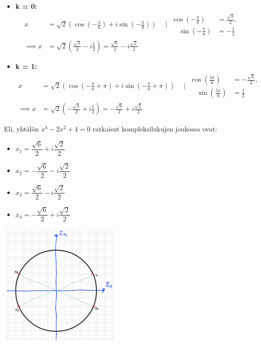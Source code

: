 \documentclass{article}
\begin{document}
\begin{itemize}
    \begin{itemize}
        \item \textbf{k = 0:}
        \[
        \begin{aligned}            
            x &= \sqrt{2} \left( \cos\left( -\frac{\pi}{6} \right) + i \sin\left( -\frac{\pi}{6} \right) \right) \quad \mid
            \begin{aligned}
                \cos\left( -\frac{\pi}{6} \right) &= \frac{\sqrt{3}}{2},\\ \quad \sin\left( -\frac{\pi}{6} \right) &= -\frac{1}{2}
            \end{aligned}\\
            \implies 
                x &= \sqrt{2} \left( \frac{\sqrt{3}}{2} - i \frac{1}{2} \right) = \frac{\sqrt{6}}{2} - i \frac{\sqrt{2}}{2}
        \end{aligned}
        \]
        \item \textbf{k = 1:}
        \[
        \begin{aligned}
            x &= \sqrt{2} \left( \cos\left( -\frac{\pi}{6} + \pi \right) + i \sin\left( -\frac{\pi}{6} + \pi \right) \right) \quad \mid
            \begin{aligned}
                \cos\left( \frac{5\pi}{6} \right) &= -\frac{\sqrt{3}}{2},\\ \quad \sin\left( \frac{5\pi}{6} \right) &= \frac{1}{2}
            \end{aligned} \\
            \implies
            x &= \sqrt{2} \left( -\frac{\sqrt{3}}{2} + i \frac{1}{2} \right) = -\frac{\sqrt{6}}{2} + i \frac{\sqrt{2}}{2}
        \end{aligned}
        \]
    \end{itemize}

    Eli, yhtälön $x^4 - 2x^2 + 4 = 0$ ratkaisut kompleksilukujen joukossa ovat:
    \begin{itemize}
        \item []\( x_1 = \dfrac{\sqrt{6}}{2} + i \dfrac{\sqrt{2}}{2} \)
        \item []\( x_2 = -\dfrac{\sqrt{6}}{2} - i \dfrac{\sqrt{2}}{2} \)
        \item []\( x_3 = \dfrac{\sqrt{6}}{2} - i \dfrac{\sqrt{2}}{2} \)
        \item []\( x_4 = -\dfrac{\sqrt{6}}{2} + i \dfrac{\sqrt{2}}{2} \)
    \end{itemize}

    \begin{center}
        \includegraphics[width=0.45\textwidth]{harj6teht6b.jpg}
    \end{center}

\end{itemize}
\end{document}
